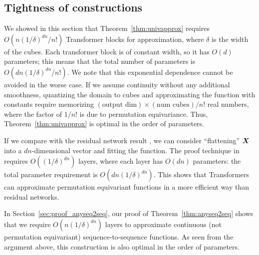 \vspace*{-10pt}
\subsection{Tightness of constructions}
\label{sec:tightness}
\vspace*{-5pt}
We showed in this section that Theorem~\ref{thm:univapprox} requires $O(n(1/\delta)^{dn}/n!)$ Transformer blocks for approximation, where $\delta$ is the width of the cubes.
Each transformer block is of constant width, so it has $O(d)$ parameters;
this means that the total number of parameters is $O(dn(1/\delta)^{dn}/n!)$.
We note that this exponential dependence cannot be avoided in the worse case. If we assume continuity without any additional smoothness, quantizing the domain to cubes and approximating the function with constants require memorizing $(\text{output dim}) \times (\text{num cubes}) /n!$ real numbers, where the factor of $1/n!$ is due to permutation equivariance. Thus, Theorem~\ref{thm:univapprox} is optimal in the order of parameters.

If we compare with the residual network result \citep{lin2018resnet}, we can consider ``flattening'' ${\bm{X}}$ into a $dn$-dimensional vector and fitting the function. The proof technique in \citep{lin2018resnet} requires $O((1/\delta)^{dn})$ layers, where each layer has $O(dn)$ parameters: the total parameter requirement is $O(dn (1/\delta)^{dn})$. This shows that Transformers can approximate permutation equivariant functions in a more efficient way than residual networks.

In Section~\ref{sec:proof_anyseq2seq}, our proof of Theorem~\ref{thm:anyseq2seq} shows that we require $O(n(1/\delta)^{dn})$ layers to approximate continuous (not permutation equivariant) sequence-to-sequence functions. As seen from the argument above, this construction is also optimal in the order of parameters.
